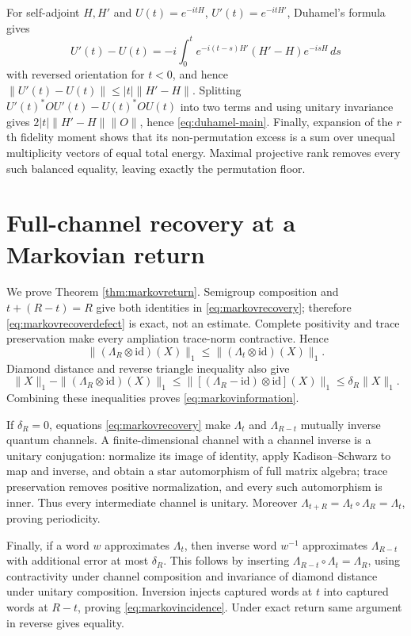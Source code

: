 For self-adjoint $H,H'$ and $U(t)=e^{-itH}$,
$U'(t)=e^{-itH'}$, Duhamel's formula gives
\[
 U'(t)-U(t)=-i\int_0^t e^{-i(t-s)H'}(H'-H)e^{-isH}\,ds
\]
with reversed orientation for $t<0$, and hence
$\|U'(t)-U(t)\|\le |t|\|H'-H\|$.  Splitting
$U'(t)^*OU'(t)-U(t)^*OU(t)$ into two terms and using unitary invariance gives
$2|t|\|H'-H\|\|O\|$, hence \eqref{eq:duhamel-main}.  Finally, expansion of the $r$th fidelity moment
shows that its non-permutation excess is a sum over unequal multiplicity
vectors of equal total energy.  Maximal projective rank removes every such
balanced equality, leaving exactly the permutation floor.

\section{Full-channel recovery at a Markovian return}

We prove Theorem \ref{thm:markovreturn}.  Semigroup composition and
$t+(R-t)=R$ give both identities in \eqref{eq:markovrecovery}; therefore
\eqref{eq:markovrecoverdefect} is exact, not an estimate.  Complete
positivity and trace preservation make every ampliation trace-norm
contractive.  Hence
\[
 \|(\Lambda_R\otimes\mathrm{id})(X)\|_1
 \le \|(\Lambda_t\otimes\mathrm{id})(X)\|_1.
\]
Diamond distance and reverse triangle inequality also give
\[
 \|X\|_1-\|(\Lambda_R\otimes\mathrm{id})(X)\|_1
 \le \|[(\Lambda_R-\mathrm{id})\otimes\mathrm{id}](X)\|_1
 \le\delta_R\|X\|_1.
\]
Combining these inequalities proves \eqref{eq:markovinformation}.

If $\delta_R=0$, equations \eqref{eq:markovrecovery} make
$\Lambda_t$ and $\Lambda_{R-t}$ mutually inverse quantum channels.  A
finite-dimensional channel with a channel inverse is a unitary conjugation:
normalize its image of identity, apply Kadison--Schwarz to map and inverse,
and obtain a star automorphism of full matrix algebra; trace preservation
removes positive normalization, and every such automorphism is inner.  Thus
every intermediate channel is unitary.  Moreover
$\Lambda_{t+R}=\Lambda_t\circ\Lambda_R=\Lambda_t$, proving periodicity.

Finally, if a word $w$ approximates $\Lambda_t$, then inverse word $w^{-1}$
approximates $\Lambda_{R-t}$ with additional error at most $\delta_R$.
This follows by inserting
$\Lambda_{R-t}\circ\Lambda_t=\Lambda_R$, using contractivity under channel
composition and invariance of diamond distance under unitary composition.
Inversion injects captured words at $t$ into captured words at $R-t$, proving
\eqref{eq:markovincidence}.  Under exact return same argument in reverse gives
equality.

